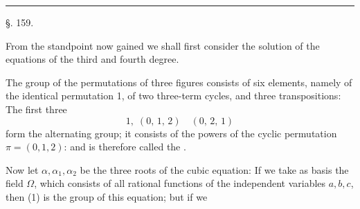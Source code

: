 \begin{center}


\rule{3cm}{0.4pt}

\S. 159.

\end{center}

From the standpoint now gained we shall first consider the
solution of the equations of the third and fourth degree.

The group of the permutations of three figures consists of
six elements, namely of the identical permutation 1, of two
three-term cycles, and three transpositions:
The first three
\[
1, \; (0,\,1,\,2) \quad (0,\,2,\,1)
\]
form the alternating group; it consists of the powers of the
cyclic permutation $\pi = (0, 1, 2)$:
and is therefore called the .

Now let $\alpha, \alpha_1, \alpha_2$ be the three roots of the cubic
equation:
If we take as basis the field $\Omega$, which consists of all rational
functions of the independent variables $a, b, c$,
then (1) is the group of this equation; but if we

